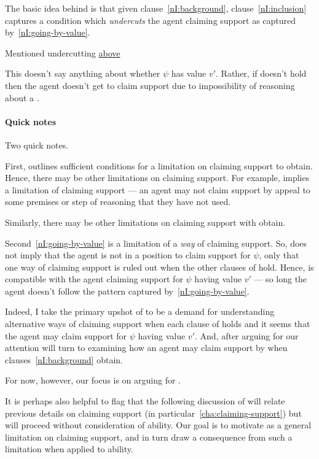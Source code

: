 \begin{note}
  The basic idea behind \nI{} is that given clause~\ref{nI:background}, clause~\ref{nI:inclusion} captures a condition which \emph{undercuts} the agent claiming support as captured by~\ref{nI:going-by-value}.

  Mentioned undercutting {\color{red} \hyperref[first-mention-undercutting-defeater]{above}}

  This doesn't say anything about whether \(\psi\) has value \(v'\).
  Rather, if \eiS{} doesn't hold then the agent doesn't get to claim support {\color{red} due to impossibility of reasoning about a \requ{}}.
\end{note}

\paragraph{Quick notes}

\begin{note}
  Two quick notes.
\end{note}

\begin{note}
  First, \LCS{} outlines sufficient conditions for a limitation on claiming support to obtain.
  Hence, there may be other limitations on claiming support.
  For example, \ESU{} implies a limitation of claiming support --- an agent may not claim support by appeal to some premises or step of reasoning that they have not used.

  Similarly, there may be other limitations on claiming support with obtain.
\end{note}

\begin{note}
  Second~\ref{nI:going-by-value} is a limitation of a \emph{way} of claiming support.
  So, \nI{} does not imply that the agent is not in a position to claim support for \(\psi\), only that one way of claiming support is ruled out when the other clauses of \nI{} hold.
  Hence, \nI{} is compatible with the agent claiming support for \(\psi\) having value \(v'\) --- so long the agent doesn't follow the pattern captured by~\ref{nI:going-by-value}.

  Indeed, I take the primary upshot of \nI{} to be a demand for understanding alternative ways of claiming support when each clause of \nI{} holds and it seems that the agent may claim support for \(\psi\) having value \(v'\).
  And, after arguing for \nI{} our attention will turn to examining how an agent may claim support by \EAS{} when clauses~\ref{nI:background} obtain.

  For now, however, our focus is on arguing for \nI{}.

  It is perhaps also helpful to flag that the following discussion of \nI{} will relate previous details on claiming support (in particular~\autoref{cha:claiming-support}) but will proceed without consideration of ability.
  Our goal is to motivate \nI{} as a general limitation on claiming support, and in turn draw a consequence from such a limitation when applied to ability.
\end{note}

